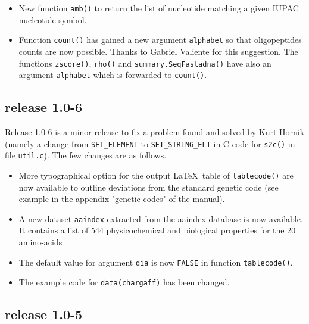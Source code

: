\documentclass{article}
\begin{document}
\begin{itemize}
\item New function \texttt{amb()} to return the list of nucleotide matching 
a given IUPAC nucleotide symbol.

\item Function \texttt{count()} has gained a new argument \texttt{alphabet}
so that oligopeptides counts are now possible. Thanks to Gabriel Valiente
for this suggestion. The functions \texttt{zscore()}, \texttt{rho()} and
\texttt{summary.SeqFastadna()} have also an argument \texttt{alphabet} which
is forwarded to \texttt{count()}.

\end{itemize}

\subsection*{release 1.0-6}

Release 1.0-6 is a minor release to fix a problem found and solved by Kurt Hornik
(namely a change from \texttt{SET\_ELEMENT} to \texttt{SET\_STRING\_ELT}
in C code for \texttt{s2c()} in file \texttt{util.c}). The few changes are
as follows.

\begin{itemize}

\item More typographical option for the output \LaTeX~table of \texttt{tablecode()}
are now available to outline deviations from the standard genetic code (see example in the
appendix "genetic codes" of the manual).

\item A new dataset \texttt{aaindex} extracted from the aaindex database
\cite{aaindex1, aaindex2, aaindex3} is now available. It contains a list
of 544 physicochemical and biological properties for the 20 amino-acids

\item The default value for argument \texttt{dia} is now \texttt{FALSE}
in function \texttt{tablecode()}.

\item The example code for \texttt{data(chargaff)} has been changed.

\end{itemize}

\subsection*{release 1.0-5}
\end{document}
